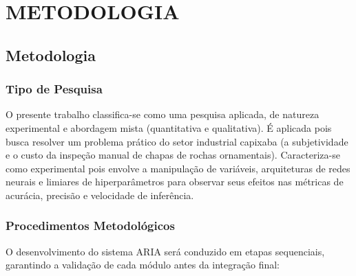 \chapter[METODOLOGIA]{METODOLOGIA}

\section{Metodologia}

\subsection{Tipo de Pesquisa}
O presente trabalho classifica-se como uma pesquisa aplicada, de natureza experimental e abordagem mista (quantitativa e qualitativa). É aplicada pois busca resolver um problema prático do setor industrial capixaba (a subjetividade e o custo da inspeção manual de chapas de rochas ornamentais). Caracteriza-se como experimental pois envolve a manipulação de variáveis, arquiteturas de redes neurais e limiares de hiperparâmetros para observar seus efeitos nas métricas de acurácia, precisão e velocidade de inferência.

\subsection{Procedimentos Metodológicos}
O desenvolvimento do sistema ARIA será conduzido em etapas sequenciais, garantindo a validação de cada módulo antes da integração final:

